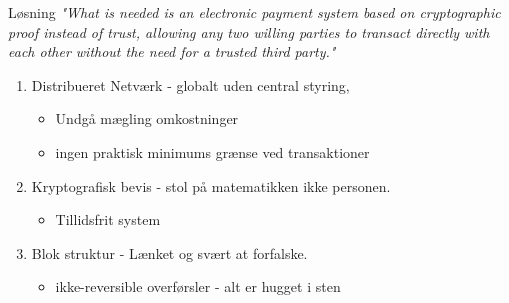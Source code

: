 \documentclass[12pt,t]{beamer}
\begin{document}
	\begin{frame}[plain]{}
		\begin{block}{Løsning}
			\textit{"What is needed is an electronic payment system based on cryptographic proof instead of trust, allowing any two willing parties to transact directly with each other without the need for a trusted	third party."} \\
		\end{block}
		\pause
		\begin{enumerate}        	
		\item Distribueret Netværk - globalt uden central styring, 
			\begin{itemize}
				\item Undgå mægling omkostninger
				\item ingen praktisk minimums grænse ved transaktioner
			\end{itemize}
		\item Kryptografisk bevis - stol på matematikken ikke personen.
			\begin{itemize}
				\item Tillidsfrit system
			\end{itemize}
		\item Blok struktur - Lænket og svært at forfalske.
			\begin{itemize}
				\item ikke-reversible overførsler - alt er hugget i sten
			\end{itemize}
		\end{enumerate}
	\end{frame}

\end{document}
